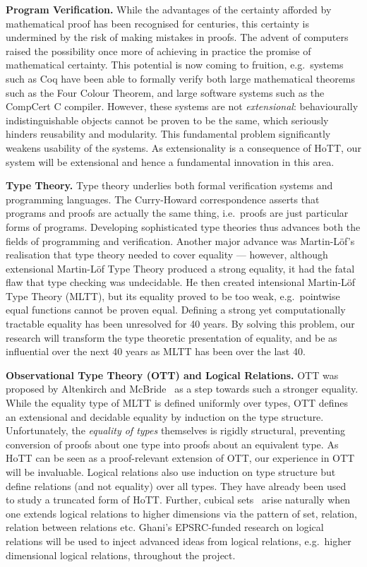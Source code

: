 \documentclass[a4paper,11pt]{article}
\newcommand{\eg}{{e.g.}\ }
\begin{document}
{\bf Program Verification.} While the advantages of the certainty
afforded by mathematical proof has been recognised for centuries, this
certainty is undermined by the risk of making mistakes in
proofs. The advent of computers raised the possibility once more of
achieving in practice the promise of mathematical certainty. This
potential is now coming to fruition, \eg systems such as Coq have been
able to formally verify both large mathematical theorems such as the
Four Colour Theorem, and large software systems such as the CompCert
C compiler. However, these systems are not {\em extensional}:
behaviourally indistinguishable objects cannot be proven to be the
same, which seriously hinders reusability and modularity.
This fundamental problem significantly weakens usability of the
systems. As extensionality is a consequence of HoTT, our system
will be extensional and hence a fundamental innovation in this area.


{\bf Type Theory.} Type theory underlies both formal verification
systems and programming languages. The Curry-Howard correspondence
asserts that programs and proofs are actually the same thing, i.e.\
proofs are just particular forms of programs. Developing
sophisticated type theories thus advances both the fields of
programming and verification. Another major advance was Martin-L\"of's
realisation that type theory needed to cover equality --- however,
although extensional Martin-L\"of Type Theory produced a strong
equality, it had the fatal flaw that type checking was undecidable. He
then created intensional Martin-L\"of Type Theory (MLTT), but its
equality proved to be too weak, \eg pointwise equal functions cannot
be proven equal. Defining a strong yet computationally tractable
equality has been unresolved for 40 years. By solving this problem,
our research will transform the type theoretic presentation of
equality, and be as influential over the next 40 years as MLTT has been
over the last 40.



{\bf Observational Type Theory (OTT) and Logical Relations.} OTT was
proposed by Altenkirch and McBride~\cite{alti:ott-conf} as a step
towards such a stronger equality. While the equality type of MLTT is
defined uniformly over types, OTT defines an extensional and decidable
equality by induction on the type structure. Unfortunately, the {\em
  equality of types} themselves is rigidly structural, preventing
conversion of proofs about one type into proofs about an equivalent
type. As HoTT can be seen as a proof-relevant extension of OTT, our
experience in OTT will be invaluable. Logical relations also use
induction on type structure but define relations (and not equality)
over all types.  They have already been
used~\cite{licataHarper:canonicity2d} to study a truncated form of
HoTT. Further, cubical sets~\cite{BezemM:cubsmt} arise naturally when
one extends logical relations to higher dimensions via the pattern of
set, relation, relation between relations etc. Ghani's EPSRC-funded
research on logical relations will be used to inject advanced ideas
from logical relations, \eg higher dimensional logical relations,
throughout the project.
\end{document}
